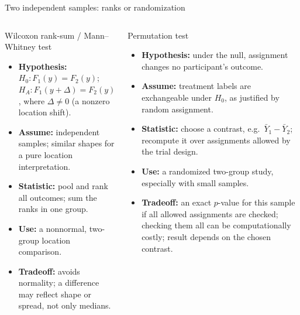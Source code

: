 \documentclass[aspectratio=169,11pt]{beamer}
\begin{document}
\begin{frame}{Two independent samples: ranks or randomization}
  \footnotesize
  \begin{columns}[T,onlytextwidth]
      \begin{block}{Wilcoxon rank-sum / Mann--Whitney test}
        \begin{itemize}
          \item \textbf{Hypothesis:} \(H_0:F_1(y)=F_2(y)\); \(H_A:F_1(y + \Delta)=F_2(y)\), where \(\Delta \neq 0\) (a nonzero location shift).
          \item \textbf{Assume:} independent samples; similar shapes for a pure location interpretation.
          \item \textbf{Statistic:} pool and rank all outcomes; sum the ranks in one group.
          \item \textbf{Use:} a nonnormal, two-group location comparison.
          \item \textbf{Tradeoff:} avoids normality; a difference may reflect shape or spread, not only medians.
        \end{itemize}
      \end{block}
      \begin{block}{Permutation test}
        \begin{itemize}
          \item \textbf{Hypothesis:} under the null, assignment changes no participant's outcome.
          \item \textbf{Assume:} treatment labels are exchangeable under \(H_0\), as justified by random assignment.
          \item \textbf{Statistic:} choose a contrast, e.g.\ \(\bar Y_1-\bar Y_2\); recompute it over assignments allowed by the trial design.
          \item \textbf{Use:} a randomized two-group study, especially with small samples.
          \item \textbf{Tradeoff:} an exact \(p\)-value for this sample if all allowed assignments are checked; checking them all can be computationally costly; result depends on the chosen contrast.
        \end{itemize}
      \end{block}
  \end{columns}
\end{frame}
\end{document}
